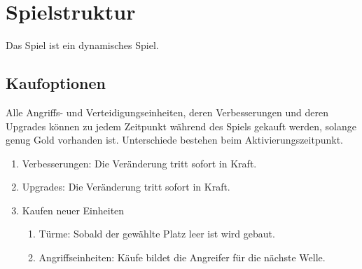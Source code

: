 \section{Spielstruktur}

%
%
%
%

Das Spiel ist ein dynamisches Spiel. 

\subsection{Kaufoptionen}
\label{subsec:kaufoptionen}
    Alle Angriffs- und Verteidigungseinheiten, deren Verbesserungen und deren
    Upgrades können zu jedem Zeitpunkt während des Spiels gekauft werden, 
    solange genug Gold vorhanden ist. Unterschiede bestehen beim 
    Aktivierungszeitpunkt.

	\begin{enumerate}
		\item Verbesserungen: Die Veränderung tritt sofort in Kraft.
		\item Upgrades: Die Veränderung tritt sofort in Kraft.
    		\item Kaufen neuer Einheiten
		\begin{enumerate}
			\item Türme: Sobald der gewählte Platz leer ist wird
				gebaut.
			\item Angriffseinheiten: Käufe bildet die Angreifer 
				für die nächste Welle.
    		\end{enumerate}
	\end{enumerate}

